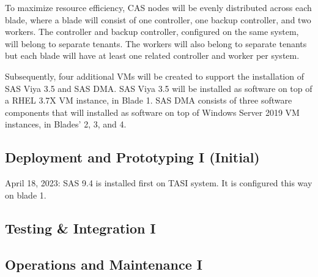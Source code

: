 To maximize resource efficiency, CAS nodes will be evenly distributed across each blade, where a blade will consist of one controller, one backup controller, and two workers. The controller and backup controller, configured on the same system, will belong to separate tenants. The workers will also belong to separate tenants but each blade will have at least one related controller and worker per system. 

Subsequently, four additional VMs will be created to support the installation of SAS Viya 3.5 and SAS DMA. SAS Viya 3.5 will be installed as software on top of a RHEL 3.7X VM instance, in Blade 1. SAS DMA consists of three software components that will installed as software on top of Windows Server 2019 VM instances, in Blades' 2, 3, and 4. 

\subsection{Deployment and Prototyping I (Initial)}

April 18, 2023:
SAS 9.4 is installed first on TASI system. It is configured this way on blade 1. 


\subsection{Testing \& Integration I}


\subsection{Operations and Maintenance I}